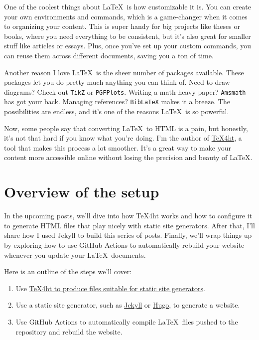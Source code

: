 \documentclass{article}
\begin{document}
One of the coolest things about \LaTeX\ is how customizable it is. You can
create your own environments and commands, which is a game-changer when it
comes to organizing your content. This is super handy for big projects like
theses or books, where you need everything to be consistent, but it’s also
great for smaller stuff like articles or essays. Plus, once you’ve set up your
custom commands, you can reuse them across different documents, saving you a
ton of time.

Another reason I love \LaTeX\ is the sheer number of packages available. These
packages let you do pretty much anything you can think of. Need to draw
diagrams? Check out \texttt{TikZ} or \texttt{PGFPlots}. Writing a math-heavy
paper? \texttt{Amsmath} has got your back. Managing references?
\texttt{BibLaTeX} makes it a breeze. The possibilities are endless, and it’s
one of the reasons \LaTeX\ is so powerful.

Now, some people say that converting \LaTeX\ to HTML is a pain, but honestly,
it’s not that hard if you know what you’re doing. I’m the author of
\href{https://tug.org/tex4ht/}{\TeX4ht}, a tool that makes this process a lot
smoother. It’s a great way to make your content more accessible online without losing the
precision and beauty of \LaTeX.

\section{Overview of the setup}

In the upcoming posts, we’ll dive into how \TeX4ht works and how to configure
it to generate HTML files that play nicely with static site generators. After
that, I’ll share how I used Jekyll to build this series of posts. 
Finally, we’ll wrap things up by exploring how to use GitHub Actions to
automatically rebuild your website whenever you update your \LaTeX\ documents.

Here is an outline of the steps we’ll cover:

\begin{enumerate}
\item Use \href{/testblog/2021/07/30/how-to-blog-with-tex4ht.html}
{\TeX4ht to produce files suitable for static site generators}.
\item Use a static site generator, such as \href{https://jekyllrb.com/}{Jekyll}
or \href{https://gohugo.io/}{Hugo}, to generate a website.
\item Use GitHub Actions to automatically compile \LaTeX\ files pushed
to the repository and rebuild the website.
\end{enumerate}
\end{document}
